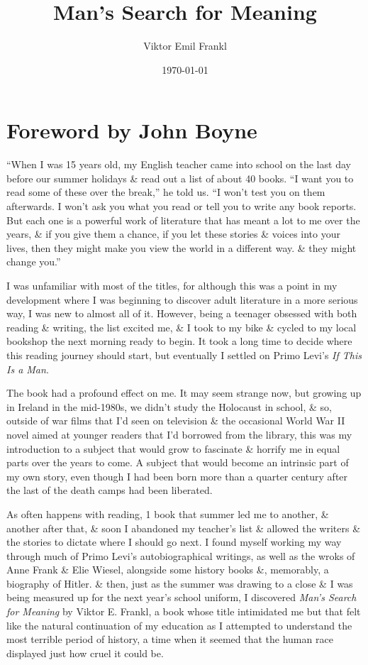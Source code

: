 \documentclass{article}
\title{Man's Search for Meaning}
\author{Viktor Emil Frankl}
\date{\today}
\numberwithin{equation}{section}
\begin{document}
\maketitle
\tableofcontents
\vspace{5mm}


\section*{Foreword by John Boyne}
``When I was 15 years old, my English teacher came into school on the last day before our summer holidays \& read out a list of about 40 books. ``I want you to read some of these over the break,'' he told us. ``I won't test you on them afterwards. I won't ask you what you read or tell you to write any book reports. But each one is a powerful work of literature that has meant a lot to me over the years, \& if you give them a chance, if you let these stories \& voices into your lives, then they might make you view the world in a different way. \& they might change you.''

I was unfamiliar with most of the titles, for although this was a point in my development where I was beginning to discover adult literature in a more serious way, I was new to almost all of it. However, being a teenager obsessed with both reading \& writing, the list excited me, \& I took to my bike \& cycled to my local bookshop the next morning ready to begin. It took a long time to decide where this reading journey should start, but eventually I settled on Primo Levi's \textit{If This Is a Man}.

The book had a profound effect on me. It may seem strange now, but growing up in Ireland in the mid-1980s, we didn't study the Holocaust in school, \& so, outside of war films that I'd seen on television \& the occasional World War II novel aimed at younger readers that I'd borrowed from the library, this was my introduction to a subject that would grow to fascinate \& horrify me in equal parts over the years to come. A subject that would become an intrinsic part of my own story, even though I had been born more than a quarter century after the last of the death camps had been liberated.

As often happens with reading, 1 book that summer led me to another, \& another after that, \& soon I abandoned my teacher's list \& allowed the writers \& the stories to dictate where I should go next. I found myself working my way through much of Primo Levi's autobiographical writings, as well as the wroks of Anne Frank \& Elie Wiesel, alongside some history books \&, memorably, a biography of Hitler. \& then, just as the summer was drawing to a close \& I was being measured up for the next year's school uniform, I discovered \textit{Man's Search for Meaning} by Viktor E. Frankl, a book whose title intimidated me but that felt like the natural continuation of my education as I attempted to understand the most terrible period of history, a time when it seemed that the human race displayed just how cruel it could be.
\end{document}
